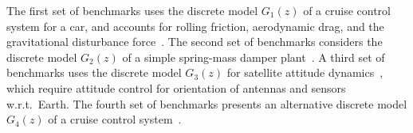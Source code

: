 \documentclass[final]{sig-alternate-05-2015}
\begin{document}
The first set of benchmarks uses the discrete model $G_1(z)$ of a cruise control
system for a car, and accounts for rolling friction, aerodynamic drag, and
the gravitational disturbance force~\cite{Astrom08}. 
%
%
The second set of benchmarks considers the discrete model $G_2(z)$ 
of a simple spring-mass damper plant~\cite{DBLP:conf/hybrid/WangGRJF16}. 
%
%
A third set of benchmarks uses the discrete model $G_{3}(z)$ for satellite attitude 
dynamics~\cite{Franklin15}, which require attitude control
for orientation of antennas and sensors w.r.t.~Earth.
The fourth set of benchmarks presents an alternative discrete model $G_4(z)$ 
of a cruise control system~\cite{DBLP:conf/hybrid/WangGRJF16}. 
%
%
%
%
%
%
%
\end{document}
